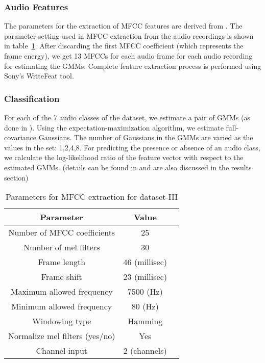 \subsubsection{Audio Features}
The parameters for the extraction of MFCC features are derived from \cite{foster2015chime}. The parameter setting used in MFCC extraction from the audio recordings is shown in table~\ref{tab:param_mfcc_db3}. After discarding the first MFCC coefficient (which represents the frame energy), we get 13 MFCCs for each audio frame for each audio recording for estimating the GMMs. Complete feature extraction process is performed using Sony's WriteFeat tool.

\subsubsection{Classification}
For each of the 7 audio classes of the dataset, we estimate a pair of GMMs (as done in \cite{foster2015chime}). Using the expectation-maximization algorithm, we estimate full-covariance Gaussians. The number of Gaussians in the GMMs are varied as the values in the set: {1,2,4,8}. For predicting the presence or absence of an audio class, we calculate the log-likelihood ratio of the feature vector with respect to the estimated GMMs. (details can be found in \cite{foster2015chime} and are also discussed in the results section)

\begin{table}[tb]
\caption[Parameters for MFCC extraction for dataset-III]{Parameters for MFCC extraction for dataset-III}
\label{tab:param_mfcc_db3}
\centering
\begin{tabular}{ccc}
\toprule
Parameter & Value \\
\midrule
Number of MFCC coefficients	& 25\\
Number of mel filters	& 30\\
Frame length & 46 (millisec)\\
Frame shift 	& 23 (millisec)\\
Maximum allowed frequency & 7500 (Hz)\\
Minimum allowed frequency & 80 (Hz)\\
Windowing type & Hamming\\
Normalize mel filters (yes/no) & Yes \\
Channel input & 2 (channels) \\
\bottomrule 
\end{tabular}
\end{table}

